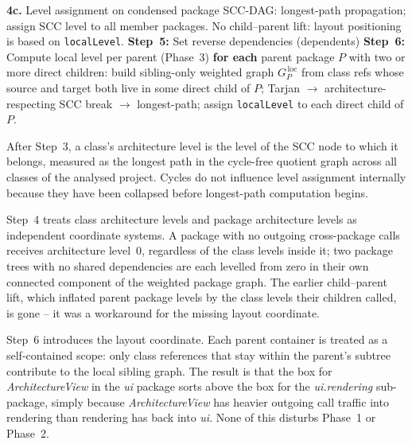 \documentclass[a4paper,twoside]{article}
\begin{document}
\begin{algorithm}[H]
  \BlankLine
  \textbf{4c.} Level assignment on condensed package SCC-DAG:\;
  \hspace{1.5em} longest-path propagation; assign SCC level to all member packages.\;
  \hspace{1.5em} No child--parent lift: layout positioning is based on \texttt{localLevel}.\;
\Indm
\BlankLine
\textbf{Step~5:} Set reverse dependencies (dependents)\;
\BlankLine
\textbf{Step~6:} Compute local level per parent (Phase~3)\;
\Indp
  \textbf{for each} parent package $P$ with two or more direct children:\;
  \hspace{1.5em} build sibling-only weighted graph $G_P^{\,\text{loc}}$ from class refs\;
  \hspace{1.5em} whose source and target both live in some direct child of $P$;\;
  \hspace{1.5em} Tarjan $\to$ architecture-respecting SCC break $\to$ longest-path;\;
  \hspace{1.5em} assign \texttt{localLevel} to each direct child of $P$.\;
\Indm
\end{algorithm}

\vspace{1em}

After Step~3, a class's architecture level is the level of the SCC node to
which it belongs, measured as the longest path in the cycle-free quotient
graph across all classes of the analysed project. Cycles do not influence
level assignment internally because they have been collapsed before
longest-path computation begins.

Step~4 treats class architecture levels and package architecture levels as
independent coordinate systems. A package with no outgoing cross-package calls
receives architecture level~0, regardless of the class levels inside it; two
package trees with no shared dependencies are each levelled from zero in their
own connected component of the weighted package graph. The earlier child--parent
lift, which inflated parent package levels by the class levels their children
called, is gone -- it was a workaround for the missing layout coordinate.

Step~6 introduces the layout coordinate. Each parent container is treated as a
self-contained scope: only class references that stay within the parent's subtree
contribute to the local sibling graph. The result is that the box for
\emph{ArchitectureView} in the \emph{ui} package sorts above the box for the
\emph{ui.rendering} sub-package, simply because \emph{ArchitectureView} has
heavier outgoing call traffic into rendering than rendering has back into
\emph{ui}. None of this disturbs Phase~1 or Phase~2.
\end{document}
